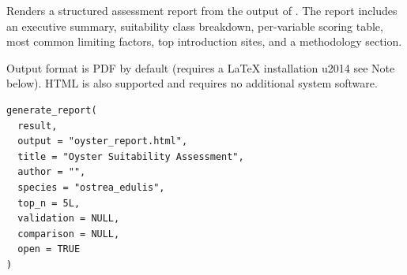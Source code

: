 \documentclass[a4paper]{book}
\begin{document}
%
\begin{Description}
Renders a structured assessment report from the output of .
The report includes an executive summary, suitability class breakdown,
per-variable scoring table, most common limiting factors, top introduction
sites, and a methodology section.

Output format is PDF by default (requires a LaTeX installation \bsl{}u2014 see Note
below). HTML is also supported and requires no additional system software.
\end{Description}
%
\begin{Usage}
\begin{verbatim}
generate_report(
  result,
  output = "oyster_report.html",
  title = "Oyster Suitability Assessment",
  author = "",
  species = "ostrea_edulis",
  top_n = 5L,
  validation = NULL,
  comparison = NULL,
  open = TRUE
)
\end{verbatim}
\end{Usage}
%
\end{document}
